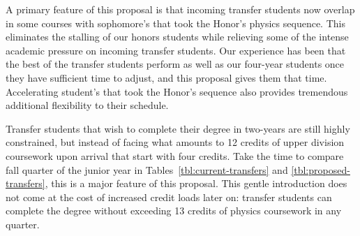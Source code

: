 \documentclass[12pt]{article}
\begin{document}
A primary feature of this proposal is that incoming transfer students now overlap in some courses with sophomore's that took the Honor's physics sequence.  This eliminates the stalling of our honors students while relieving some of the intense academic pressure on incoming transfer students.  Our experience has been that the best of the transfer students perform as well as our four-year students once they have sufficient time to adjust, and this proposal gives them that time.  Accelerating student's that took the Honor's sequence also provides tremendous additional flexibility to their schedule.  

Transfer students that wish to complete their degree in two-years are still highly constrained, but instead of facing what amounts to 12 credits of upper division coursework upon arrival that start with four credits.  Take the time to compare fall quarter of the junior year in Tables~\ref{tbl:current-transfers} and \ref{tbl:proposed-transfers}, this is a major feature of this proposal.  This gentle introduction does not come at the cost of increased credit loads later on: transfer students can complete the degree without exceeding 13 credits of physics coursework in any quarter.  
\end{document}
